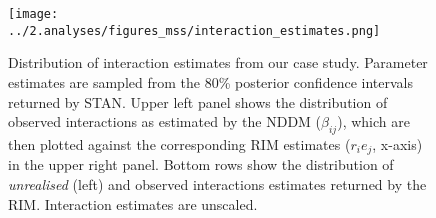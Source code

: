 \documentclass[a4,12pt]{article}
\begin{document}


    \begin{figure}[H]
        \texttt{[image: ../2.analyses/figures\_mss/interaction\_estimates.png]}
        \caption{Distribution of interaction estimates from our case study. Parameter estimates are sampled from the 80\% posterior confidence intervals returned by STAN. Upper left panel shows the distribution of observed interactions as estimated by the NDDM ($\beta_{ij}$), which are then plotted against the corresponding RIM estimates ($r_i e_j$, x-axis) in the upper right panel. Bottom rows show the distribution of \textit{unrealised} (left) and observed interactions estimates returned by the RIM. Interaction estimates are unscaled.}
        \label{fig:adist}
    \end{figure}

\end{document}
